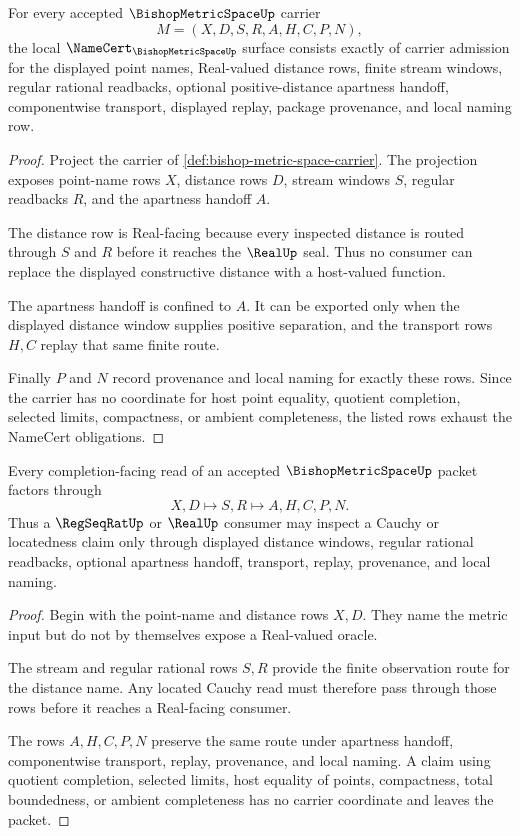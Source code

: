 \begin{theorem}
\label{thm:bishop-metric-space-namecert-obligations}
For every accepted $\BishopMetricSpaceUp$ carrier
$$
M=(X,D,S,R,A,H,C,P,N),
$$
the local $\NameCert_{\BishopMetricSpaceUp}$ surface consists exactly of carrier admission for the displayed point names, Real-valued distance rows, finite stream windows, regular rational readbacks, optional positive-distance apartness handoff, componentwise transport, displayed replay, package provenance, and local naming row.
\end{theorem}
\begin{proof}
Project the carrier of \autoref{def:bishop-metric-space-carrier}. The projection exposes point-name rows $X$, distance rows $D$, stream windows $S$, regular readbacks $R$, and the apartness handoff $A$.

The distance row is Real-facing because every inspected distance is routed through $S$ and $R$ before it reaches the $\RealUp$ seal. Thus no consumer can replace the displayed constructive distance with a host-valued function.

The apartness handoff is confined to $A$. It can be exported only when the displayed distance window supplies positive separation, and the transport rows $H,C$ replay that same finite route.

Finally $P$ and $N$ record provenance and local naming for exactly these rows. Since the carrier has no coordinate for host point equality, quotient completion, selected limits, compactness, or ambient completeness, the listed rows exhaust the NameCert obligations.
\end{proof}

\begin{theorem}
\label{thm:bishop-metric-space-located-cauchy-route}
Every completion-facing read of an accepted $\BishopMetricSpaceUp$ packet factors through
$$
X,D\longmapsto S,R\longmapsto A,H,C,P,N .
$$
Thus a $\RegSeqRatUp$ or $\RealUp$ consumer may inspect a Cauchy or locatedness claim only through displayed distance windows, regular rational readbacks, optional apartness handoff, transport, replay, provenance, and local naming.
\end{theorem}
\begin{proof}
Begin with the point-name and distance rows $X,D$. They name the metric input but do not by themselves expose a Real-valued oracle.

The stream and regular rational rows $S,R$ provide the finite observation route for the distance name. Any located Cauchy read must therefore pass through those rows before it reaches a Real-facing consumer.

The rows $A,H,C,P,N$ preserve the same route under apartness handoff, componentwise transport, replay, provenance, and local naming. A claim using quotient completion, selected limits, host equality of points, compactness, total boundedness, or ambient completeness has no carrier coordinate and leaves the packet.
\end{proof}

